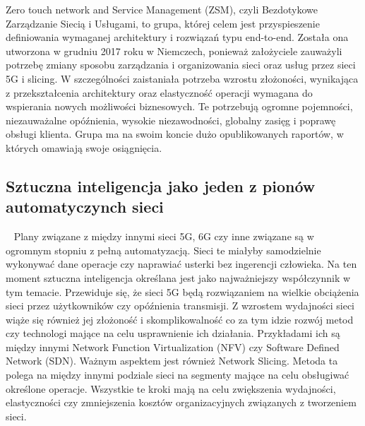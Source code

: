 \documentclass[sn-mathphys,Numbered]{sn-jnl}
\theoremstyle{thmstyleone}%
\theoremstyle{thmstyletwo}%
\theoremstyle{thmstylethree}%
\begin{document}
Zero touch network and Service Management (ZSM), czyli Bezdotykowe Zarządzanie Siecią i Usługami, to grupa, której celem jest przyspieszenie definiowania wymaganej architektury i rozwiązań typu end-to-end. Została ona utworzona w grudniu 2017 roku w Niemczech, ponieważ założyciele zauważyli potrzebę zmiany sposobu zarządzania i organizowania sieci oraz usług przez sieci 5G i slicing. W szczególności zaistaniała potrzeba wzrostu złożoności, wynikająca z przekształcenia architektury oraz elastyczność operacji wymagana do wspierania nowych możliwości biznesowych. Te potrzebują ogromne pojemności, niezauważalne opóźnienia, wysokie niezawodności, globalny zasięg i poprawę obsługi klienta. Grupa ma na swoim koncie dużo opublikowanych raportów, w których omawiają swoje osiągnięcia\cite{dahmen-lhuissier_zero_nodate}.

\subsection{Sztuczna inteligencja jako jeden z pionów automatyczynch sieci}
~   Plany związane z między innymi sieci 5G, 6G czy inne związane są w ogromnym stopniu z pełną automatyzacją. Sieci te miałyby samodzielnie wykonywać dane operacje czy naprawiać usterki bez ingerencji człowieka. Na ten moment sztuczna inteligencja określana jest jako najważniejszy współczynnik w tym temacie. Przewiduje się, że sieci 5G będą rozwiązaniem na wielkie obciążenia sieci przez użytkowników czy opóźnienia transmisji. Z wzrostem wydajności sieci wiąże się również jej złożoność i skomplikowalność co za tym idzie rozwój metod czy technologi mające na celu usprawnienie ich działania. Przykładami ich są między innymi Network Function Virtualization (NFV) czy Software Defined Network (SDN)\cite{benzaid_ai-driven_2020}. Ważnym aspektem jest również Network Slicing. Metoda ta polega na między innymi podziale sieci na segmenty mające na celu obsługiwać określone operacje\cite{corporation_what_nodate}. Wszystkie te kroki mają na celu zwiększenia wydajności, elastyczności czy zmniejszenia kosztów organizacyjnych związanych z tworzeniem sieci.
\end{document}
